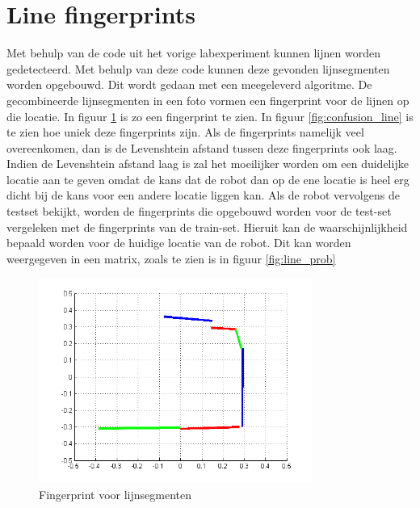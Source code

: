 \documentclass[a4paper]{article}
\begin{document}
\section{Line fingerprints}
Met behulp van de code uit het vorige labexperiment kunnen lijnen worden gedetecteerd. Met behulp van deze code kunnen deze gevonden lijnsegmenten worden opgebouwd. Dit wordt gedaan met een meegeleverd algoritme. De gecombineerde lijnsegmenten in een foto vormen een fingerprint voor de lijnen op die locatie. In figuur \ref{fig:lijnfinger} is zo een fingerprint te zien. 
In figuur \ref{fig:confusion_line} is te zien hoe uniek deze fingerprints zijn. Als de fingerprints namelijk veel overeenkomen, dan is de Levenshtein afstand tussen deze fingerprints ook laag. Indien de Levenshtein afstand laag is zal het moeilijker worden om een duidelijke locatie aan te geven omdat de kans dat de robot dan op de ene locatie is heel erg dicht bij de kans voor een andere locatie liggen kan. 
Als de robot vervolgens de testset bekijkt, worden de fingerprints die opgebouwd worden voor de test-set vergeleken met de fingerprints van de train-set. Hieruit kan de waarschijnlijkheid bepaald worden voor de huidige locatie van de robot. Dit kan worden weergegeven in een matrix, zoals te zien is in figuur \ref{fig:line_prob}
\begin{figure}[h]
	\centering
	\includegraphics[width=0.8\textwidth]{fingerprint.png}
	\caption{Fingerprint voor lijnsegmenten}
	\label{fig:lijnfinger}
\end{figure}
\end{document}
